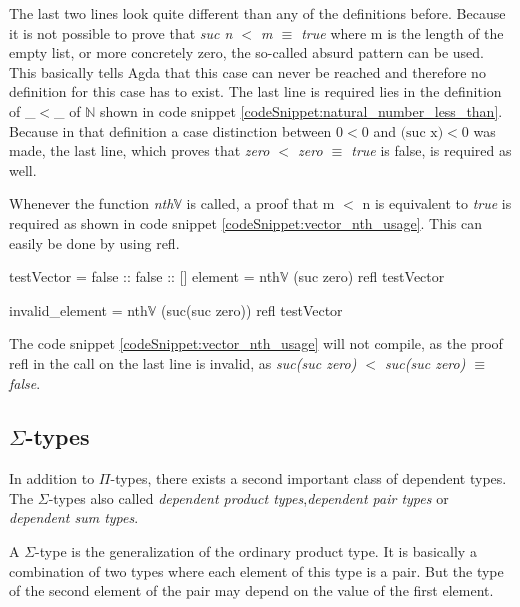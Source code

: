 The last two lines look quite different than any of the definitions before.
Because it is not possible to prove that \emph{suc n $<$ m $\equiv$ true} where m is the length of the empty list, or more concretely zero, the so-called absurd pattern can be used. 
This basically tells Agda that this case can never be reached and therefore no definition for this case has to exist.
The last line is required lies in the definition of \_$<$\_ of $\mathbb{N}$ shown in code snippet \ref{codeSnippet:natural_number_less_than}.
Because in that definition a case distinction between $0 < 0$ and $\text{(suc x)} < 0$ was made, the last line, which proves that \emph{zero $<$ zero $\equiv$ true} is false, is required as well.

Whenever the function \emph{nth$\mathbb{V}$} is called, a proof that m $<$ n is equivalent to \emph{true} is required as shown in code snippet \ref{codeSnippet:vector_nth_usage}. This can easily be done by using refl.

\begin{codesnippet}[mathescape=true, caption={Usage of \emph{nth} function in Agda}, label={codeSnippet:vector_nth_usage}]
testVector = false :: false :: []
element = nth$\mathbb{V}$ (suc zero) refl testVector

invalid_element = nth$\mathbb{V}$ (suc(suc zero)) 
                  refl testVector
\end{codesnippet}

The code snippet \ref{codeSnippet:vector_nth_usage} will not compile, as the proof refl in the call on the last line is invalid, as \emph{suc(suc zero) $<$ suc(suc zero) $\equiv$ false}.

\subsection{$\Sigma$-types}
In addition to $\Pi$-types, there exists a second important class of dependent types. 
The $\Sigma$-types also called \emph{dependent product types}\cite{10.1145/2841316},\emph{dependent pair types}\cite{10.1145/2841316} or \emph{dependent sum types}\cite{10.5555/1076265}.

A $\Sigma$-type is the generalization of the ordinary product type. 
It is basically a combination of two types where each element of this type is a pair. 
But the type of the second element of the pair may depend on the value of the first element.

